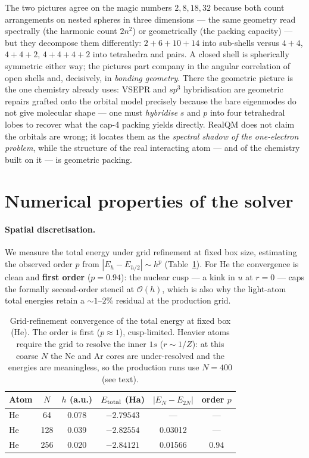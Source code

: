 \documentclass[11pt]{article}
\begin{document}
The two pictures agree on the magic numbers $2,8,18,32$ because both count arrangements on
nested spheres in three dimensions --- the same geometry read spectrally (the harmonic
count $2n^2$) or geometrically (the packing capacity) --- but they decompose them
differently: $2{+}6{+}10{+}14$ into sub-shells versus $4{+}4$, $4{+}4{+}2$,
$4{+}4{+}4{+}2$ into tetrahedra and pairs. A closed shell is spherically symmetric either way; the
pictures part company in the angular correlation of open shells and, decisively, in
\emph{bonding geometry}. There the geometric picture is the one chemistry already uses:
VSEPR and $sp^3$ hybridisation are geometric repairs grafted onto the orbital model
precisely because the bare eigenmodes do not give molecular shape --- one must
\emph{hybridise} $s$ and $p$ into four tetrahedral lobes to recover what the cap-4 packing
yields directly. RealQM does not claim the orbitals are wrong; it locates them as the
\emph{spectral shadow of the one-electron problem}, while the structure of the real
interacting atom --- and of the chemistry built on it --- is geometric packing.

\section{Numerical properties of the solver}\label{sec:convergence}

\paragraph{Spatial discretisation.} We measure the total energy under grid refinement
at fixed box size, estimating the observed order $p$ from $|E_h-E_{h/2}|\sim h^p$
(Table~\ref{tab:hconv}). For He the convergence is clean and \textbf{first order}
($p=0.94$): the nuclear cusp --- a kink in $u$ at $r=0$ --- caps the formally
second-order stencil at $\mathcal{O}(h)$, which is also why the light-atom total
energies retain a ${\sim}1$--$2\%$ residual at the production grid.

\begin{table}[t]
\centering
\caption{Grid-refinement convergence of the total energy at fixed box (He). The order is
first ($p\approx 1$), cusp-limited. Heavier atoms require the grid to resolve the inner
$1s$ ($r\sim 1/Z$): at this coarse $N$ the Ne and Ar cores are under-resolved and the
energies are meaningless, so the production runs use $N=400$ (see text).}
\label{tab:hconv}
\begin{tabular}{lccccc}
\toprule
Atom & $N$ & $h$ (a.u.) & $E_{\rm total}$ (Ha) & $|E_N-E_{2N}|$ & order $p$ \\
\midrule
He & 64  & 0.078 & $-2.79543$ & ---     & --- \\
He & 128 & 0.039 & $-2.82554$ & 0.03012 & --- \\
He & 256 & 0.020 & $-2.84121$ & 0.01566 & $0.94$ \\
\bottomrule
\end{tabular}
\end{table}
\end{document}
